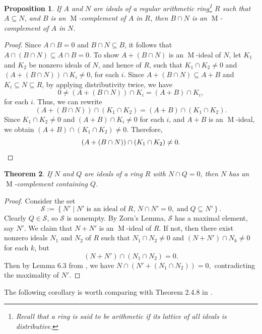 \documentclass[11pt,leqno]{amsart}
\DeclareMathOperator{\m}{M}
\newtheorem{theorem}{Theorem}[section]
\newtheorem{proposition}[theorem]{Proposition}
\theoremstyle{definition}
\theoremstyle{remark}
\numberwithin{equation}{section}
\numberwithin{equation}{section}
\begin{document}
\begin{proposition}
If $A$ and $N$ are ideals of a regular arithmetic ring\footnote{Recall that a ring is said to be \emph{arithmetic} if its lattice of all ideals is distributive.} $R$ such that $A\subseteq N$, and $B$ is an $\m$-complement of $A$ in $R$, then $B \cap N$ is an $\m$-complement of $A$ in $N$.
\end{proposition}

\begin{proof}
Since $A \cap B = 0$ and $B \cap N \subseteq B$, it follows that
\(
A \cap (B \cap N) \subseteq A \cap B = 0.
\) To show  $A + (B \cap N)$ is an $\m$-ideal of $N$,
let $K_1$ and $K_2$  be  nonzero ideals of $N$, and hence of $R$, such that
\(
K_1\cap K_2 \neq 0\) and \((A + (B \cap N)) \cap K_i \neq 0 \), for each $i$.
Since $A + (B \cap N) \subseteq A + B$ and $K_i \subseteq N \subseteq R$, by applying distributivity twice, we have
\[
0\neq (A + (B \cap N)) \cap K_i = (A + B) \cap K_i,\] for each $i$.
Thus, we can rewrite
\[
(A + (B \cap N)) \cap \left( K_1\cap K_2\right) = (A + B) \cap \left( K_1\cap K_2 \right).
\]
Since    
\(
K_1\cap K_2 \neq 0\) and \((A + B) \cap K_i \neq 0
\) for each $i$, and $A + B$ is an $\m$-ideal, we obtain
\(   
(A + B) \cap \left( K_1\cap K_2 \right) \neq 0.
\)    
Therefore, 
\[
(A + (B \cap N)) \cap \left( K_1\cap K_2 \right) \neq 0.
\qedhere	\]
\end{proof}

\begin{theorem}\label{mct}
If \(N\) and \(Q\) are ideals of a ring \(R\) with \(N \cap Q = 0\), then \(N\) has an \( \m \)-complement containing \(Q\).
\end{theorem} 

\begin{proof}
Consider the set \[\mathcal{S}:= \left\{ N'\mid N'\;\text{is an ideal of}\; R,\, N \cap N' = 0,\;\text{and}\; Q \subseteq N'\right\}.\]
Clearly \(Q \in  \mathcal{S}\), so \(\mathcal{S}\) is nonempty. By Zorn's Lemma, \(\mathcal{S}\) has a maximal element, say \(N'\).
We claim that \(N + N'\) is an $\m$-ideal of $R$. If not, then there exist nonzero ideals \(N_1\) and \(N_2\) of \(R\) such that \(N_1\cap N_2\neq 0\) and \((N + N') \cap N_k \neq 0\) for each \(k\), but \[(N + N') \cap \left(N_1\cap N_2 \right) = 0.\] Then by Lemma 6.3 from 
\cite{Cal00}, we have $N\cap \left(N'+(N_1\cap N_2) \right) = 0,$  contradicting the maximality of \(N'\). 
\end{proof}

The following corollary is worth comparing with Theorem 2.4.8 in \cite{Row88}.
\end{document}

